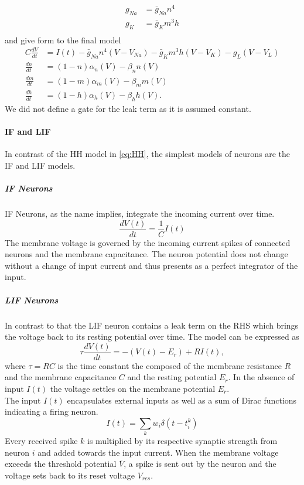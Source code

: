 	\begin{equation}
	\begin{aligned}
	g_{Na} &= \bar{g}_{Na} n^4\\
	g_{K} &= \bar{g}_{K} m^3h\\
	\end{aligned}
	\end{equation}
	and give form to the final model
	\begin{equation}\label{eq:HH}
	\begin{aligned}
	C\frac{dV}{dt} &= I(t) -\bar{g}_{Na} n^4(V-V_{Na}) - \bar{g}_{K} m^3h(V-V_{K}) -g_L(V-V_{L})\\
	\frac{dn}{dt} &= (1-n)\alpha_n(V) - \beta_n n (V)\\
	\frac{dm}{dt} &= (1-m)\alpha_m(V) - \beta_m m (V)\\
	\frac{dh}{dt} &= (1-h)\alpha_h(V) - \beta_h h (V).
	\end{aligned}
	\end{equation}
	We did not define a gate for the leak term as it is assumed constant.
	\paragraph{IF and LIF}
	In contrast of the \ac{HH} model in \cref{eq:HH}, the simplest models of neurons are the \ac{IF} and \ac{LIF} models.\\
	\subparagraph{IF Neurons}
	\ac{IF} Neurons, as the name implies, integrate the incoming current over time.
	\begin{equation}
	\frac{d V(t)}{d t} = \frac{1}{C}I(t)
	\end{equation}
	The membrane voltage is governed by the incoming current spikes of connected neurons and the membrane capacitance. The neuron potential does not change without a change of input current and thus presents as a perfect integrator of the input.\\
	\subparagraph{\ac{LIF} Neurons}
	In contrast to that the \ac{LIF} neuron contains a leak term on the RHS which brings the voltage back to its resting potential over time. The model can be expressed as
	\begin{equation}
	\tau\frac{dV(t)}{dt} = -(V(t)-E_r) + RI(t),
	\end{equation}
	where $\tau = RC$ is the time constant the composed of the membrane resistance $R$ and the membrane capacitance $C$ and the resting potential $E_r$. In the absence of input $I(t)$ the voltage settles on the membrane potential $E_r$.\\
	The input $I(t)$ encapsulates external inputs as well as a sum of Dirac functions indicating a firing neuron.
	\begin{equation}
	I(t) = \sum_k w_i\delta(t-t^k_i)
	\end{equation}
	Every received spike $k$ is multiplied by its respective synaptic strength from neuron $i$ and added towards the input current. When the membrane voltage exceeds the threshold potential $\bar{V}$, a spike is sent out by the neuron and the voltage sets back to its reset voltage $V_{res}$.
